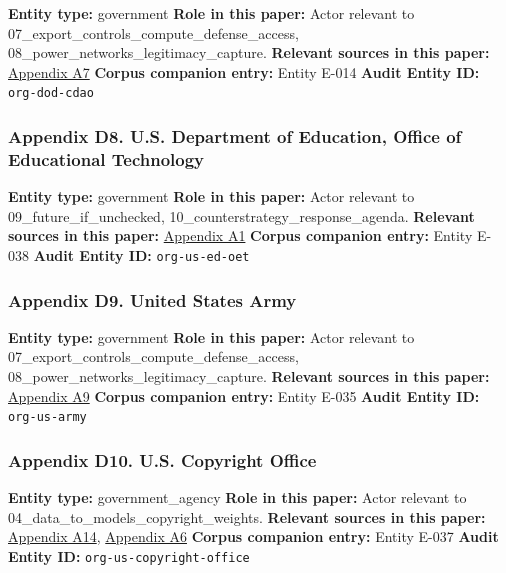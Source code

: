 \documentclass[
  american,
  11pt,
  letterpaper,
]{article}
\begin{document}
\textbf{Entity type:} government \textbf{Role in this paper:} Actor
relevant to 07\_export\_controls\_compute\_defense\_access,
08\_power\_networks\_legitimacy\_capture. \textbf{Relevant sources in
this paper:}
\hyperref[appendix-a7-introducing-openai-for-government]{Appendix A7}
\textbf{Corpus companion entry:} Entity E-014 \textbf{Audit Entity ID:}
\texttt{org-dod-cdao}

\subsubsection{Appendix D8. U.S. Department of Education, Office of
Educational
Technology}\label{appendix-d8-u-s-department-of-education-office-of-educational-technology}

\textbf{Entity type:} government \textbf{Role in this paper:} Actor
relevant to 09\_future\_if\_unchecked,
10\_counterstrategy\_response\_agenda. \textbf{Relevant sources in this
paper:}
\hyperref[appendix-a1-artificial-intelligence-and-the-future-of-teaching-and-learning-insights-and-recommendations]{Appendix
A1} \textbf{Corpus companion entry:} Entity E-038 \textbf{Audit Entity
ID:} \texttt{org-us-ed-oet}

\subsubsection{Appendix D9. United States
Army}\label{appendix-d9-united-states-army}

\textbf{Entity type:} government \textbf{Role in this paper:} Actor
relevant to 07\_export\_controls\_compute\_defense\_access,
08\_power\_networks\_legitimacy\_capture. \textbf{Relevant sources in
this paper:}
\hyperref[appendix-a9-army-launches-detachment-201-executive-innovation-corps-to-drive-tech-transformation]{Appendix
A9} \textbf{Corpus companion entry:} Entity E-035 \textbf{Audit Entity
ID:} \texttt{org-us-army}

\subsubsection{Appendix D10. U.S. Copyright
Office}\label{appendix-d10-u-s-copyright-office}

\textbf{Entity type:} government\_agency \textbf{Role in this paper:}
Actor relevant to 04\_data\_to\_models\_copyright\_weights.
\textbf{Relevant sources in this paper:}
\hyperref[appendix-a14-copyright-and-artificial-intelligence-notice-of-inquiry]{Appendix
A14},
\hyperref[appendix-a6-copyright-and-artificial-intelligence-part-3-generative-ai-training-pre-publication-version]{Appendix
A6} \textbf{Corpus companion entry:} Entity E-037 \textbf{Audit Entity
ID:} \texttt{org-us-copyright-office}
\end{document}
